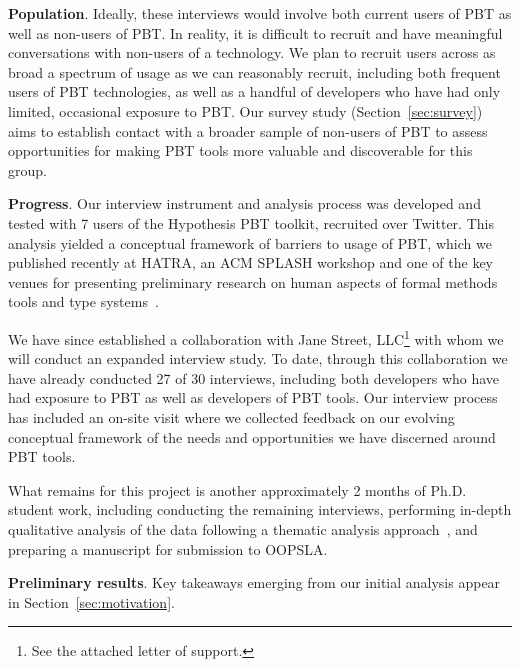 \textbf{Population}. Ideally, these interviews would involve both current users
of PBT as well as non-users of PBT. In reality, it is difficult to recruit and
have meaningful conversations with non-users of a technology. We plan to
recruit users across as broad a spectrum of usage as we can reasonably recruit,
including both frequent users of PBT technologies, as well as a handful of
developers who have had only limited, occasional exposure to PBT. Our survey
study (Section~\ref{sec:survey}) aims to establish contact with a broader
sample of non-users of PBT to assess opportunities for making PBT tools more
valuable and discoverable for this group.

\textbf{Progress}. Our interview instrument and analysis process was developed
and tested with 7 users of the Hypothesis PBT toolkit, recruited over Twitter.
This analysis yielded a conceptual framework of barriers to usage of PBT, which
we published recently at HATRA, an ACM SPLASH workshop and one of the key
venues for presenting preliminary research on human aspects of formal methods
tools and type systems~\cite{goldstein2022some}.

We have since established a collaboration with Jane Street, LLC\footnote{See
the attached letter of support.} with whom we will conduct an expanded
interview study. To date, through this collaboration we have already conducted
27 of 30 interviews, including both developers who have had exposure to PBT as
well as developers of PBT tools. Our interview process has included an on-site
visit where we collected feedback on our evolving conceptual framework of the
needs and opportunities we have discerned around PBT tools.

What remains for this project is another approximately 2 months of Ph.D.
student work, including conducting the remaining interviews, performing
in-depth qualitative analysis of the data following a thematic analysis
approach~\cite[Chapter 5]{blandford2016qualitative}, and preparing a manuscript
for submission to OOPSLA.

\textbf{Preliminary results}. Key takeaways emerging from our initial analysis
appear in Section~\ref{sec:motivation}. 

